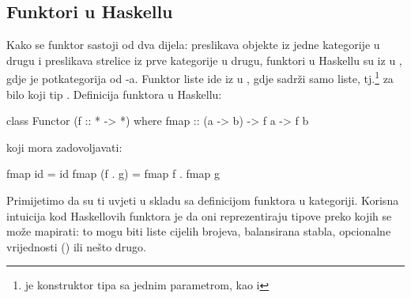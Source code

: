   \subsection{Funktori u Haskellu}
  Kako se funktor sastoji od dva dijela: preslikava objekte iz jedne kategorije u drugu
  i preslikava strelice iz prve kategorije u drugu, funktori u Haskellu su iz
   u , gdje je  potkategorija od
  -a. Funktor liste ide iz  u ,
  gdje  sadrži samo liste, tj.\codei{[T]}\footnote{
    \codei{[a]} je konstruktor tipa sa jednim parametrom,
    kao i }
  za bilo koji tip . Definicija funktora u Haskellu:
  \begin{mcode}
    class Functor (f :: * -> *) where
      fmap :: (a -> b) -> f a -> f b
  \end{mcode}
  koji mora zadovoljavati:
  \begin{mcode}
    fmap id = id
    fmap (f . g) = fmap f . fmap g
  \end{mcode}
  Primijetimo da su ti uvjeti u skladu sa definicijom funktora u kategoriji.
  Korisna intuicija kod Haskellovih funktora je da oni reprezentiraju tipove
  preko kojih se može mapirati: to mogu biti liste cijelih brojeva,
  balansirana stabla, opcionalne vrijednosti () ili nešto drugo.

